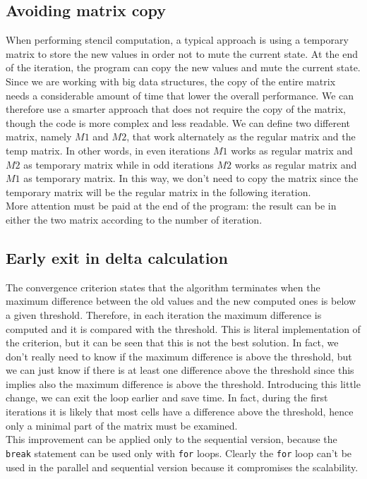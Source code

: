\documentclass{article}
\begin{document}
\subsection{Avoiding matrix copy}
When performing stencil computation, a typical approach is using a temporary matrix to store the new values in order not to mute the current state. At the end of the iteration, the program can copy the new values and mute the current state. Since we are working with big data structures, the copy of the entire matrix needs a considerable amount of time that lower the overall performance. We can therefore use a smarter approach that does not require the copy of the matrix, though the code is more complex and less readable. We can define two different matrix, namely $M1$ and $M2$, that work alternately as the regular matrix and the temp matrix. In other words, in even iterations $M1$ works as regular matrix and $M2$ as temporary matrix while in odd iterations $M2$ works as regular matrix and $M1$ as temporary matrix. In this way, we don't need to copy the matrix since the temporary matrix will be the regular matrix in the following iteration. \\
More attention must be paid at the end of the program: the result can be in either the two matrix according to the number of iteration.

\subsection{Early exit in delta calculation}
The convergence criterion states that the algorithm terminates when the maximum difference between the old values and the new computed ones is below a given threshold. Therefore, in each iteration the maximum difference is computed and it is compared with the threshold. This is literal implementation of the criterion, but it can be seen that this is not the best solution. In fact, we don't really need to know if the maximum difference is above the threshold, but we can just know if there is at least one difference above the threshold since this implies also the maximum difference is above the threshold. Introducing this little change, we can exit the loop earlier and save time. In fact, during the first iterations it is likely that most cells have a difference above the threshold, hence only a minimal part of the matrix must be examined. \\
This improvement can be applied only to the sequential version, because the \texttt{break} statement can be used only with \texttt{for} loops. Clearly the \texttt{for} loop can't be used in the parallel and sequential version because it compromises the scalability.
\end{document}
